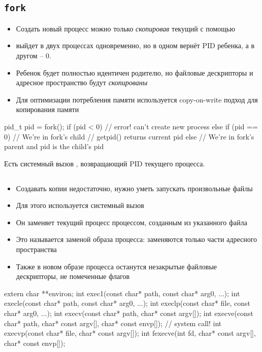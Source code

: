   \subsection{\texttt{fork}}
    \begin{itemize}
      \item Создать новый процесс можно только \textit{скопировав} текущий с помощью 
      \item {} выйдет в двух процессах одновременно, но в одном вернёт PID ребенка, а в другом -- 0.
      \item Ребенок будет полностью идентичен родителю, но файловые дескрипторы и адресное пространство будут \textit{скопированы}
      \item Для оптимизации потребления памяти используется copy-on-write подход для копирования памяти 
    \end{itemize}
\begin{cminted}
pid_t pid = fork();
if (pid < 0) {
  // error! can't create new process
} else if (pid == 0) {
  // We're in fork's child
  // getpid() returns current pid
} else {
  // We're in fork's parent and pid is the child's pid
}
\end{cminted}
Есть системный вызов , возвращающий PID текущего процесса.

  \subsection{}
    \begin{itemize}
      \item Создавать копии недостаточно, нужно уметь запускать произвольные файлы
      \item Для этого используется системный вызов 
      \item Он заменяет текущий процесс процессом, созданным из указанного файла
      \item Это называется заменой образа процесса: заменяются только части адресного пространства 
      \item Также в новом образе процесса останутся незакрытые файловые дескрипторы, не помеченные флагов 
    \end{itemize}

\begin{cminted}
extern char **environ;
int exec1(const char* path, const char* arg0, ...);
int execle(const char* path, const char* arg0, ...);
int execlp(const char* file, const char* arg0, ...);
int execv(const char* path, char* const argv[]);
int execve(const char* path, char* const argv[],
           char* const envp[]);  // system call!
int execvp(const char* file, char* const argv[]);
int fexecve(int fd, char* const argv[], char* const envp[]);
\end{cminted}

